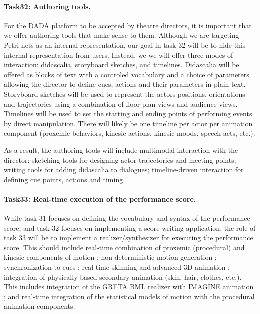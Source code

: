 \paragraph{Task32: Authoring tools.}

For the DADA platform to be accepted by theatre directors, it is important that we offer authoring tools that make sense to them. 
Although we are targeting  Petri nets as an internal representation, our goal in task 32 will be to hide this internal representation 
from users. Instead, we we will offer three modes of interaction: didascalia, storyboard sketches, and timelines. Didascalia will
be offered as blocks of text with a controled vocabulary and a choice of parameters allowing the director to define cues, actions and their parameters 
in plain text.  Storyboard sketches will be used to represent the actors positions, orientations and trajectories using a combination of floor-plan views 
and audience views. Timelines will be used to set the starting and ending points of performing events by direct manipulation. There will likely be
one timeline per actor per animation component (proxemic behaviors, kinesic actions, kinesic moods, speech acts, etc.).

As a result, the authoring tools will include multimodal interaction with the director: sketching tools for designing actor trajectories and meeting points; 
writing tools for adding didascalia to dialogues; timeline-driven interaction for defining cue points, actions and timing. 




\paragraph{Task33: Real-time execution of the performance score.} 

While task 31 focuses on defining the vocabulary and syntax of the performance score, and task 32 focuses on implementing 
a score-writing application, the role of task 33 will be to implement a realizer/synthesizer for executing the performance score.
This should include real-time combination of proxemic (procedural) and kinesic components of motion ; non-deterministic motion generation ; synchronization to cues ; real-time skinning and advanced 3D animation ; integration of physically-based secondary animation (skin, hair, clothes, etc.).  This includes integration of the GRETA BML realizer with IMAGINE animation ; and real-time integration of the statistical models of motion with the procedural animation components.


